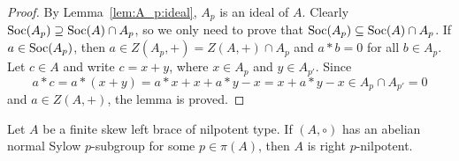 \begin{proof}
    By Lemma~\ref{lem:A_p:ideal}, $A_p$ is an ideal of $A$. 
    Clearly $\operatorname{Soc}(A_p)\supseteq\operatorname{Soc}(A)\cap A_p$, so 
    we only need to prove that $\operatorname{Soc}(A_p)\subseteq\operatorname{Soc}(A)\cap A_p$. 
    If $a\in\operatorname{Soc}(A_p)$, then $a\in Z(A_p,+)=Z(A,+)\cap A_p$ and
    $a*b=0$ for all $b\in A_p$. Let $c\in A$ and write $c=x+y$, where $x\in A_p$ and 
    $y\in A_{p'}$. Since 
    \[
    a*c=a*(x+y)=a*x+x+a*y-x=x+a*y-x\in A_p\cap A_{p'}=0
    \]
    and $a\in Z(A,+)$, the lemma is proved.
\end{proof}

\begin{theorem}
\label{thm:right_p}
    Let $A$ be a finite skew left brace of nilpotent type. If $(A,\circ)$ has an abelian normal
    Sylow $p$-subgroup for some $p\in\pi(A)$, then $A$ is right $p$-nilpotent.
\end{theorem}


